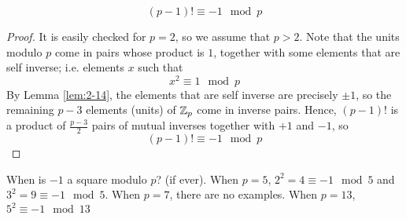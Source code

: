 \documentclass{article}
\begin{document}
\begin{nthm}
    \[
        (p-1)!  \equiv -1 \mod p 
    \]
\end{nthm}
\begin{proof}
    It is easily checked for $p=2$, so we assume that $p > 2$.
    Note that the units modulo $p$ come in pairs whose product is $1$, together with some elements that are self inverse; i.e. elements $x$ such that
    \[
        x^2 \equiv 1 \mod p  
    \]
    By Lemma \ref{lem:2-14}, the elements that are self inverse are precisely $\pm 1$, so the remaining $p - 3$ elements (units) of $\mathbb{Z}_p$ come in inverse pairs.
    Hence, $(p - 1)!$ is a product of $\frac{p - 3}{2}$ pairs of mutual inverses together with $+1$ and $-1$, so
    \[
        (p - 1) ! \equiv -1 \mod p  
    \]
\end{proof}

\begin{question}
    When is $-1$ a square modulo $p$? (if ever).
    When $p = 5$, $2^2 = 4 \equiv -1 \mod 5$ and $3^2 = 9 \equiv -1 \mod 5$.
    When $p = 7$, there are no examples.
    When $p = 13$, $5^2 \equiv -1 \mod 13$
\end{question}
\end{document}
